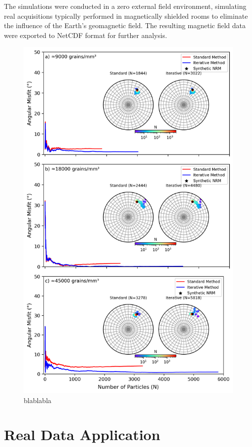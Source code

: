 The simulations were conducted in a zero external field environment, simulating real acquisitions typically performed in magnetically shielded rooms to eliminate the influence of the Earth's geomagnetic field. The resulting magnetic field data were exported to NetCDF format for further analysis.


\begin{figure}[tb!]
  \centering
  \includegraphics[width=0.7\linewidth]{paper/figures/synthetic-different-densities-stereoplot.png}
  \caption{
blablabla
  }
  \label{synthetic-data-stereograms}
\end{figure}



\section{Real Data Application}

